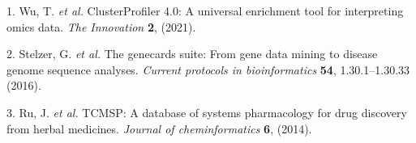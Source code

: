 \documentclass[
]{article}
\newenvironment{cslreferences}%
  {}%
  {\par}
\begin{document}
\hypertarget{refs}{}
\begin{cslreferences}
\leavevmode\hypertarget{ref-ClusterprofilerWuTi2021}{}%
1. Wu, T. \emph{et al.} ClusterProfiler 4.0: A universal enrichment tool for interpreting omics data. \emph{The Innovation} \textbf{2}, (2021).

\leavevmode\hypertarget{ref-TheGenecardsSStelze2016}{}%
2. Stelzer, G. \emph{et al.} The genecards suite: From gene data mining to disease genome sequence analyses. \emph{Current protocols in bioinformatics} \textbf{54}, 1.30.1--1.30.33 (2016).

\leavevmode\hypertarget{ref-TcmspADatabaRuJi2014}{}%
3. Ru, J. \emph{et al.} TCMSP: A database of systems pharmacology for drug discovery from herbal medicines. \emph{Journal of cheminformatics} \textbf{6}, (2014).
\end{cslreferences}
\end{document}
